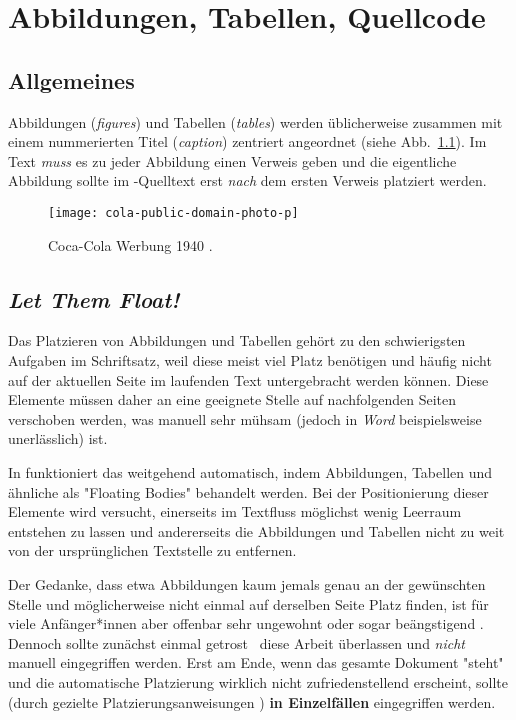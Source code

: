 \chapter{Abbildungen, Tabellen, Quellcode}
\label{cha:Abbildungen}

\section{Allgemeines}

Abbildungen (\emph{figures}) und Tabellen (\emph{tables}) werden
üblicherweise zusammen mit einem nummerierten Titel (\emph{caption})
zentriert angeordnet (siehe Abb.~\ref{fig:CocaCola}). Im Text \emph{muss} es
zu jeder Abbildung einen Verweis geben und die eigentliche Abbildung sollte
im \latex-Quelltext erst \emph{nach} dem ersten Verweis platziert werden.

\begin{figure}
	\centering
	\texttt{[image: cola-public-domain-photo-p]} %
	\caption{Coca-Cola Werbung 1940 \cite{CocaCola1940}.}
	\label{fig:CocaCola}
\end{figure}


\section{\emph{Let Them Float!}}

Das Platzieren von Abbildungen und Tabellen gehört zu den schwierigsten
Aufgaben im Schriftsatz, weil diese meist viel Platz benötigen und häufig
nicht auf der aktuellen Seite im laufenden Text untergebracht werden können.
Diese Elemente müssen daher an eine geeignete Stelle auf nachfolgenden Seiten
verschoben werden, was manuell sehr mühsam (jedoch in \emph{Word}
beispielsweise unerlässlich) ist.

In \latex funktioniert das weitgehend automatisch, indem Abbildungen,
Tabellen und ähnliche als "Floating Bodies" behandelt werden. Bei der
Positionierung dieser Elemente wird versucht, einerseits im Textfluss
möglichst wenig Leer\-raum entstehen zu lassen und andererseits die
Abbildungen und Tabellen nicht zu weit von der ursprünglichen Textstelle zu
entfernen.

Der Gedanke, dass etwa Abbildungen kaum jemals genau an der ge\-wünsch\-ten
Stelle und möglicherweise nicht einmal auf derselben Seite Platz finden, ist
für viele Anfänger*innen aber offenbar sehr ungewohnt oder sogar beängstigend
. Dennoch sollte zunächst einmal getrost \latex\ diese Arbeit überlassen und
\emph{nicht} manuell eingegriffen werden. Erst am Ende, wenn das gesamte
Dokument "steht" und die automatische Platzierung wirklich nicht
zufriedenstellend erscheint, sollte (durch gezielte Platzierungsanweisungen
\cite[S.~39]{Oetiker2021}) \textbf{in Einzelfällen} eingegriffen werden.



